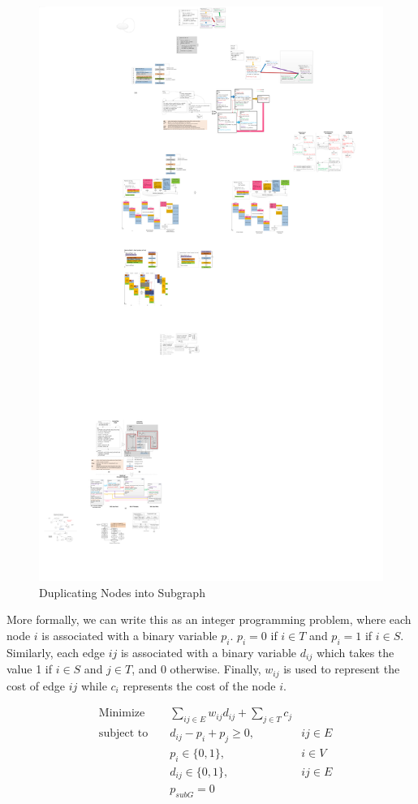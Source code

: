 \begin{figure}[htp]
\begin{center}
\includegraphics[width=0.75\linewidth]{chap3fig/graphcut2.pdf}
\caption{Duplicating Nodes into Subgraph 
\label{fig:gc}}
\end{center}
\end{figure}

More formally, we can write this as an integer programming problem, where
each node $i$ is associated with a binary variable $p_i$. $p_i = 0$ if $i \in T$
and $p_i = 1$ if $i \in S$. Similarly, each edge $ij$ is associated with
a binary variable $d_{ij}$ which takes the value 1 if $i \in S$ and $j \in T$, and 0 otherwise. Finally, $w_{ij}$ is used to represent the cost of edge $ij$
while $c_i$ represents the cost of the node $i$.


\begin{equation*}
\begin{aligned}
\label{ilpopt}
& {\text{Minimize}} & & \underset{ij \in E}\sum w_{ij}d_{ij} +  \underset{j \in T}\sum c_j \\
& \text{subject to }
& & d_{ij} - p_i+p_j \ge 0, & ij \in E \\
& &  & p_i \in \{0,1\}, & i \in V \\
& & & d_{ij} \in \{0,1\}, & ij \in E \\
& & & p_{subG} = 0
\end{aligned}
\end{equation*}



